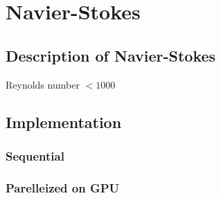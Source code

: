 \chapter{Navier-Stokes}

\section{Description of Navier-Stokes}

Reynolds number $< 1000$

\section{Implementation}

\subsection{Sequential}

\subsection{Parelleized on GPU}
